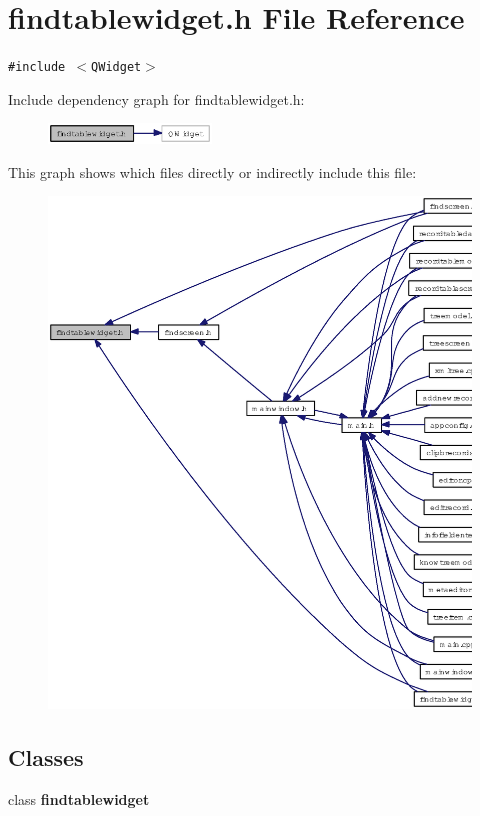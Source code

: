\section{findtablewidget.h File Reference}
\label{findtablewidget_8h}
{\tt \#include $<$QWidget$>$}\par


Include dependency graph for findtablewidget.h:\begin{figure}[H]
\begin{center}
\leavevmode
\includegraphics[width=123pt]{findtablewidget_8h__incl}
\end{center}
\end{figure}


This graph shows which files directly or indirectly include this file:\begin{figure}[H]
\begin{center}
\leavevmode
\includegraphics[width=323pt]{findtablewidget_8h__dep__incl}
\end{center}
\end{figure}
\subsection*{Classes}
\begin{CompactItemize}
\item 
class {\bf findtablewidget}
\end{CompactItemize}
